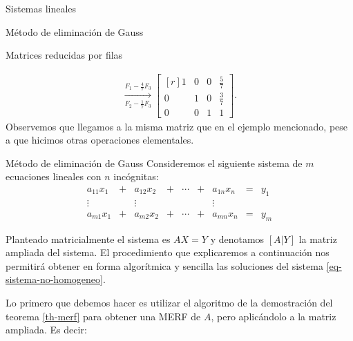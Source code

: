\begin{chapter}{Sistemas lineales}
\begin{section}{Método de eliminación de Gauss }
\begin{subsection}{Matrices reducidas por filas}
\begin{ejemplo*}
\begin{multline*}
                    \underset{F_2-\frac17F_3}{\stackrel{F_1 -\frac47 F_3}{\longrightarrow}} 
                    \begin{bmatrix*}[r] 1& 0&0& \frac{5}7 \\ 0&1 &0&\frac37 \\ 0&0&1&1 \end{bmatrix*}.
                    \end{multline*}
                    Observemos que llegamos a la misma matriz que en el ejemplo mencionado, pese a que hicimos otras operaciones elementales.
                \end{ejemplo*}
                
            \end{subsection}
                
                

    \begin{subsection}{Método de eliminación de Gauss}\label{elim-gauss} Consideremos el siguiente sistema de $m$ ecuaciones lineales con $n$ incógnitas:
        \begin{equation}\label{eq-sistema-no-homogeneo}
        \begin{matrix}
        a_{11}x_1& + &a_{12}x_2& + &\cdots& + &a_{1n}x_n &= &y_1\\
        \vdots&  &\vdots& &&  &\vdots \\
        a_{m1}x_1& + &a_{m2}x_2& + &\cdots& + &a_{mn}x_n &=&y_m
        \end{matrix}
        \end{equation}
        
        Planteado  matricialmente el sistema es $AX=Y$  y denotamos $[A|Y]$ la matriz ampliada del sistema. El  procedimiento que explicaremos a continuación nos permitirá obtener en forma algorítmica y sencilla las soluciones del sistema \eqref{eq-sistema-no-homogeneo}. 
        
        Lo primero que debemos hacer es utilizar el algoritmo de la demostración del teorema \ref{th-merf}  para obtener una MERF de $A$, pero aplicándolo a la matriz ampliada. Es decir:  


\end{subsection}
\end{section}
\end{chapter}
